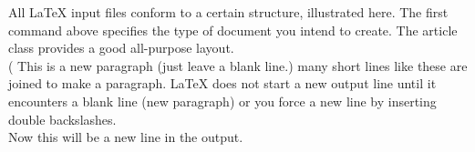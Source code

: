 \documentclass{article}
\begin{document}
All LaTeX input files conform to a certain structure, illustrated here.
The first command above specifies the type of document you intend to create. 
The article class provides a good all-purpose layout.
\\
\left(  
This is a new paragraph (just leave a blank line.) 
many short lines
like these
are joined to make a paragraph. LaTeX does not start a new output
line until it encounters a blank line (new paragraph) or you force
a new line by inserting double backslashes.\\ Now this will be
a new line in the output.

\end{document}
